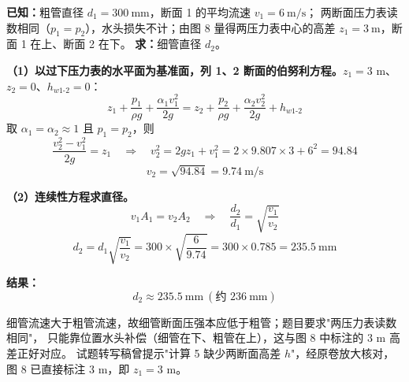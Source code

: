 \begin{jie}
\textbf{已知：}粗管直径 $d_1=300\ \mathrm{mm}$，断面 1 的平均流速 $v_1=6\ \mathrm{m/s}$；
两断面压力表读数相同（$p_1=p_2$），水头损失不计；由图 8 量得两压力表中心的高差 $z_1=3\ \mathrm{m}$，断面 1 在上、断面 2 在下。
\textbf{求：}细管直径 $d_2$。

\textbf{（1）以过下压力表的水平面为基准面，列 1、2 断面的伯努利方程。}$z_1=3$ m、$z_2=0$、$h_{w1\text{-}2}=0$：
\[
z_1+\frac{p_1}{\rho g}+\frac{\alpha_1v_1^2}{2g}
=z_2+\frac{p_2}{\rho g}+\frac{\alpha_2v_2^2}{2g}+h_{w1\text{-}2}
\]
取 $\alpha_1=\alpha_2\approx1$ 且 $p_1=p_2$，则
\[
\frac{v_2^2-v_1^2}{2g}=z_1
\quad\Longrightarrow\quad
v_2^2=2gz_1+v_1^2=2\times9.807\times3+6^2=94.84
\]
\[
v_2=\sqrt{94.84}=9.74\ \mathrm{m/s}
\]

\textbf{（2）连续性方程求直径。}
\[
v_1A_1=v_2A_2
\quad\Longrightarrow\quad
\frac{d_2}{d_1}=\sqrt{\frac{v_1}{v_2}}
\]
\[
d_2=d_1\sqrt{\frac{v_1}{v_2}}
=300\times\sqrt{\frac{6}{9.74}}=300\times0.785=235.5\ \mathrm{mm}
\]

\textbf{结果：}
\[
\boxed{d_2\approx235.5\ \mathrm{mm}\ (\text{约 }236\ \mathrm{mm})}
\]
\end{jie}

\begin{tishi}
细管流速大于粗管流速，故细管断面压强本应低于粗管；题目要求"两压力表读数相同"，
只能靠位置水头补偿（细管在下、粗管在上），这与图 8 中标注的 $3$ m 高差正好对应。
试题转写稿曾提示"计算 5 缺少两断面高差 $h$"，经原卷放大核对，图 8 已直接标注 $3$ m，即 $z_1=3$ m。
\end{tishi}


